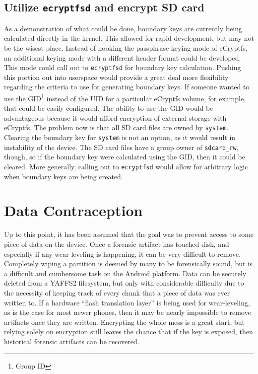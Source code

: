 \subsection{Utilize \texttt{ecryptfsd} and encrypt SD card}
As a demonstration of what could be done, boundary keys are currently being calculated directly in the kernel. This allowed for
rapid development, but may not be the wisest place. Instead of hooking the passphrase keying mode of
eCryptfs, an additional keying mode with a different header format could be developed. This mode could call out to
\texttt{ecryptfsd} for boundary key calculation. Pushing this portion out into userspace would provide a great deal more flexibility
regarding the criteria to use for generating boundary keys. If someone wanted to use the GID\footnote{Group ID} instead of the UID
for a particular eCryptfs volume, for example, that could be easily configured. The ability to use the GID would be
advantageous because it would afford encryption of external storage with eCryptfs. The problem now is that all SD card files are
owned by \texttt{system}. Clearing the boundary key for \texttt{system} is not an option, as it would result in instability of the
device. The SD card files have a group owner of \texttt{sdcard\_rw}, though, so if the boundary key were calculated using the
GID, then it could be cleared. More generally, calling out to \texttt{ecryptfsd} would allow for arbitrary logic when
boundary keys are being created.

\section{Data Contraception}
Up to this point, it has been assumed that the goal was to prevent access to some piece of data on the device.  Once a forensic
artifact has touched disk, and especially if any wear-leveling is happening, it can be very difficult to remove.  Completely
wiping a partition is deemed by many to be forensically sound, but is a difficult and cumbersome task on the Android platform.  Data can
be securely deleted from a YAFFS2 filesystem, but only with considerable difficulty due to the necessity of keeping track of every
chunk that a piece of data was ever written to. If a hardware ``flash translation layer'' is being used for wear-leveling, as is the
case for most newer phones, then it may be nearly impossible to remove artifacts once they are written.  Encrypting the whole mess
is a great start, but relying solely on encryption still leaves the chance that if the key is exposed, then historical forensic
artifacts can be recovered.

